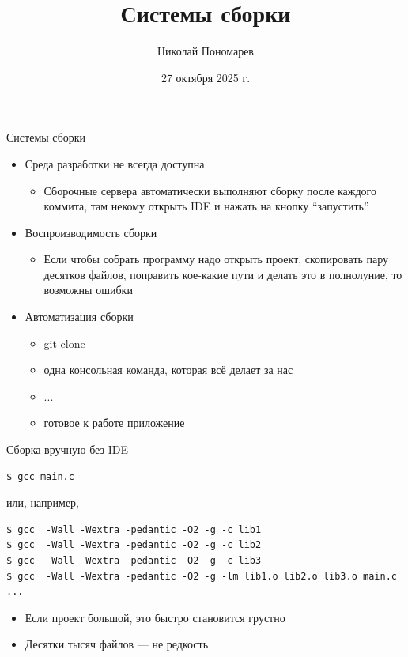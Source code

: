 \documentclass[aspectratio=169]{beamer}
\title{Системы сборки}
\author{Николай Пономарев}
\date{27 октября 2025 г.}
\begin{document}
\begin{frame}
    \titlepage
\end{frame}

\begin{frame}{Системы сборки}
    \begin{itemize}
        \item Среда разработки не всегда доступна
              \begin{itemize}
                  \item Сборочные сервера автоматически выполняют сборку после каждого коммита, там некому открыть IDE и нажать на кнопку \enquote{запустить}
              \end{itemize}
        \item Воспроизводимость сборки
              \begin{itemize}
                  \item Если чтобы собрать программу надо открыть проект, скопировать пару десятков файлов, поправить кое-какие пути и делать это в полнолуние, то возможны ошибки
              \end{itemize}
        \item Автоматизация сборки
              \begin{itemize}
                  \item git clone
                  \item одна консольная команда, которая всё делает за нас
                  \item ...
                  \item готовое к работе приложение
              \end{itemize}
    \end{itemize}
\end{frame}

\begin{frame}[fragile]{Сборка вручную без IDE}

    \begin{verbatim}
$ gcc main.c
    \end{verbatim}
    или, например,
    \begin{verbatim}
$ gcc  -Wall -Wextra -pedantic -O2 -g -c lib1
$ gcc  -Wall -Wextra -pedantic -O2 -g -c lib2
$ gcc  -Wall -Wextra -pedantic -O2 -g -c lib3
$ gcc  -Wall -Wextra -pedantic -O2 -g -lm lib1.o lib2.o lib3.o main.c ...
    \end{verbatim}

    \vspace{1em}

    \begin{itemize}
        \item Если проект большой, это быстро становится грустно
        \item Десятки тысяч файлов --- не редкость
    \end{itemize}

\end{frame}
\end{document}
